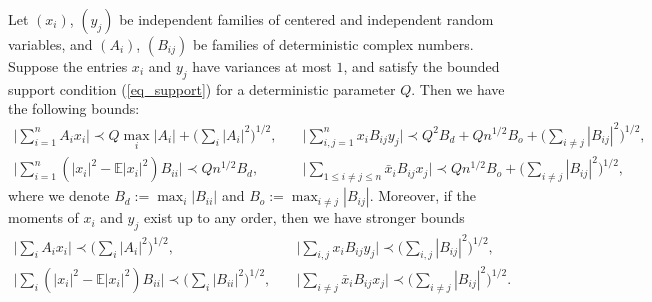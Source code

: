 \begin{lemma}\label{largedeviation}
Let $(x_i)$, $(y_j)$ be independent families of centered and independent random variables, and $(A_i)$, $(B_{ij})$ be families of deterministic complex numbers. Suppose the entries $x_i$ and $y_j$ have variances at most $1$, and satisfy the bounded support condition (\ref{eq_support}) for a deterministic parameter $Q$. %
Then we have the following bounds:
\begin{align}
\Big| \sum_{i=1}^n A_i x_i \Big\vert \prec Q \max_{i} \vert A_i \vert+ \Big(\sum_i |A_i|^2 \Big)^{1/2} , \quad &\Big\vert  \sum_{i,j=1}^n x_i B_{ij} y_j \Big\vert \prec Q^2 B_d  + Q n^{1/2}B_o +  \Big(\sum_{i\ne j} |B_{ij}|^2\Big)^{{1}/{2}},\label{eq largedev10}  \\
\Big\vert  \sum_{i=1}^n (|x_i|^2-\mathbb E|x_i|^2) B_{ii}  \Big\vert  \prec Q n^{1/2}B_d   , \quad &\Big\vert  \sum_{1\le i\ne j\le n} \bar x_i B_{ij} x_j \Big\vert  \prec Qn^{1/2}B_o +  \Big(\sum_{i\ne j} |B_{ij}|^2\Big)^{{1}/{2}} ,\label{eq largedev20} 
\end{align}
where we denote $B_d:=\max_{i} |B_{ii} |$ and $B_o:= \max_{i\ne j} |B_{ij}|.$ Moreover, if the moments of $ x_i$ and $ y_j$ exist up to any order, then we have stronger bounds
\begin{align}
\Big\vert \sum_i A_i x_i \Big\vert \prec  \Big(\sum_i |A_i|^2 \Big)^{1/2} , \quad  & \Big\vert \sum_{i,j} x_i B_{ij} y_j \Big\vert \prec  \Big(\sum_{i, j} |B_{ij}|^2\Big)^{{1}/{2}} ,\label{eq largedev1} \\
 \Big\vert  \sum_{i} (|x_i|^2-\mathbb E|x_i|^2) B_{ii}  \Big\vert  \prec  \Big( \sum_i |B_{ii} |^2\Big)^{1/2}  ,\quad & \Big\vert  \sum_{i\ne j} \bar x_i B_{ij} x_j \Big\vert  \prec \Big(\sum_{i\ne j} |B_{ij}|^2\Big)^{{1}/{2}} .\label{eq largedev2}
\end{align}
\end{lemma}

